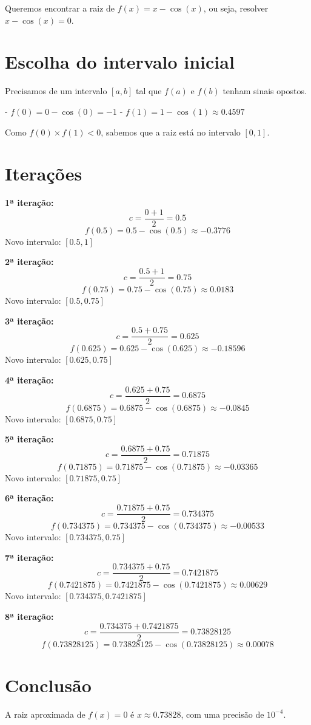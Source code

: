 \documentclass{article}
\begin{document}
Queremos encontrar a raiz de \( f(x) = x - \cos(x) \), ou seja, resolver \(x - \cos(x) = 0\).

\section*{Escolha do intervalo inicial}

Precisamos de um intervalo \([a, b]\) tal que \(f(a)\) e \(f(b)\) tenham sinais opostos.

- \(f(0) = 0 - \cos(0) = -1\)
- \(f(1) = 1 - \cos(1) \approx 0.4597\)

Como \(f(0) \times f(1) < 0\), sabemos que a raiz está no intervalo \([0, 1]\).

\section*{Iterações}

\textbf{1ª iteração:}
\[
c = \frac{0 + 1}{2} = 0.5
\]
\[
f(0.5) = 0.5 - \cos(0.5) \approx -0.3776
\]
Novo intervalo: \([0.5, 1]\)

\textbf{2ª iteração:}
\[
c = \frac{0.5 + 1}{2} = 0.75
\]
\[
f(0.75) = 0.75 - \cos(0.75) \approx 0.0183
\]
Novo intervalo: \([0.5, 0.75]\)

\textbf{3ª iteração:}
\[
c = \frac{0.5 + 0.75}{2} = 0.625
\]
\[
f(0.625) = 0.625 - \cos(0.625) \approx -0.18596
\]
Novo intervalo: \([0.625, 0.75]\)

\textbf{4ª iteração:}
\[
c = \frac{0.625 + 0.75}{2} = 0.6875
\]
\[
f(0.6875) = 0.6875 - \cos(0.6875) \approx -0.0845
\]
Novo intervalo: \([0.6875, 0.75]\)

\textbf{5ª iteração:}
\[
c = \frac{0.6875 + 0.75}{2} = 0.71875
\]
\[
f(0.71875) = 0.71875 - \cos(0.71875) \approx -0.03365
\]
Novo intervalo: \([0.71875, 0.75]\)

\textbf{6ª iteração:}
\[
c = \frac{0.71875 + 0.75}{2} = 0.734375
\]
\[
f(0.734375) = 0.734375 - \cos(0.734375) \approx -0.00533
\]
Novo intervalo: \([0.734375, 0.75]\)

\textbf{7ª iteração:}
\[
c = \frac{0.734375 + 0.75}{2} = 0.7421875
\]
\[
f(0.7421875) = 0.7421875 - \cos(0.7421875) \approx 0.00629
\]
Novo intervalo: \([0.734375, 0.7421875]\)

\textbf{8ª iteração:}
\[
c = \frac{0.734375 + 0.7421875}{2} = 0.73828125
\]
\[
f(0.73828125) = 0.73828125 - \cos(0.73828125) \approx 0.00078
\]

\section*{Conclusão}

A raiz aproximada de \(f(x) = 0\) é \(x \approx 0.73828\), com uma precisão de \(10^{-4}\).
\end{document}
